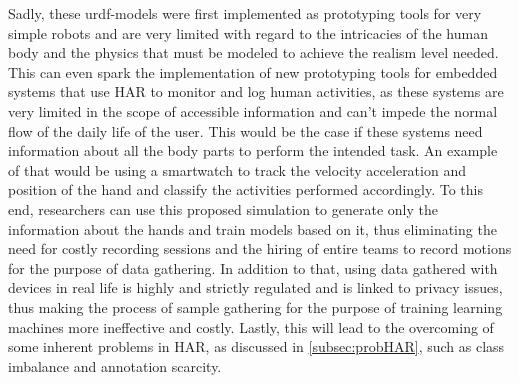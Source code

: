 Sadly, these urdf-models were first implemented as prototyping tools for very simple robots and are very limited with regard to the intricacies of the human body and the physics that must be modeled to achieve the realism level needed. This can even spark the implementation of new prototyping tools for embedded systems that use HAR to monitor and log human activities, as these systems are very limited in the scope of accessible information and can't impede the normal flow of the daily life of the user. This would be the case if these systems need information about all the body parts to perform the intended task. An example of that would be using a smartwatch to track the velocity acceleration and position of the hand and classify the activities performed accordingly. To this end, researchers can use this proposed simulation to generate only the information about the hands and train models based on it, thus eliminating the need for costly recording sessions and the hiring of entire teams to record motions for the purpose of data gathering. In addition to that, using data gathered with devices in real life is highly and strictly regulated and is linked to privacy issues, thus making the process of sample gathering for the purpose of training learning machines more ineffective and costly. Lastly, this will lead to the overcoming of some inherent problems in HAR, as discussed in \ref{subsec:probHAR}, such as class imbalance and annotation scarcity.
